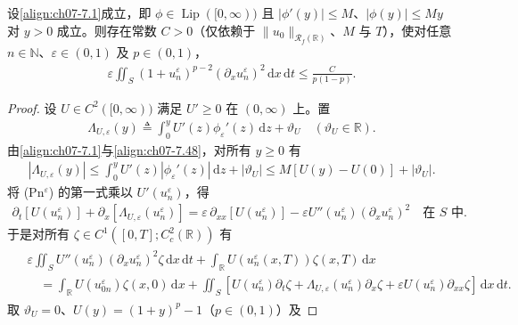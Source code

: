 ﻿\documentclass[../../main.tex]{subfiles}%
\begin{document}
\begin{lemma}\label{lemma:ch07-7.4.2}
设\eqref{align:ch07-7.1}成立，即 $\phi\in\operatorname{Lip}([0,\infty))$ 且 $|\phi'(y)|\leqslant M$、$|\phi(y)|\leqslant My$ 对 $y>0$ 成立。则存在常数 $C>0$（仅依赖于 $\|u_0\|_{\mathscr{R}_f(\mathbb{R})}$、$M$ 与 $T$），使对任意 $n\in\mathbb{N}$、$\varepsilon\in(0,1)$ 及 $p\in(0,1)$，
\begin{align}
\varepsilon\iint_S(1+u_n^\varepsilon)^{p-2}(\partial_xu_n^\varepsilon)^2\,\mathrm{d}x\,\mathrm{d}t
\leqslant\frac{C}{p(1-p)}. \label{align:ch07-7.53}
\end{align}
\end{lemma}

\begin{proof}
设 $U\in C^2([0,\infty))$ 满足 $U'\geqslant0$ 在 $(0,\infty)$ 上。置
\begin{align}
\Lambda_{U,\varepsilon}(y)\triangleq\int_0^yU'(z)\phi_\varepsilon'(z)\,\mathrm{d}z+\vartheta_U\quad(\vartheta_U\in\mathbb{R}). \label{align:ch07-7.54}
\end{align}
由\eqref{align:ch07-7.1}与\eqref{align:ch07-7.48}，对所有 $y\geqslant0$ 有
\begin{align}
|\Lambda_{U,\varepsilon}(y)|\leqslant\int_0^yU'(z)|\phi_\varepsilon'(z)|\,\mathrm{d}z+|\vartheta_U|
\leqslant M[U(y)-U(0)]+|\vartheta_U|. \label{align:ch07-7.55}
\end{align}
将 (Pn$^\varepsilon$) 的第一式乘以 $U'(u_n^\varepsilon)$，得
\begin{align}
\partial_t[U(u_n^\varepsilon)]+\partial_x[\Lambda_{U,\varepsilon}(u_n^\varepsilon)]
=\varepsilon\,\partial_{xx}[U(u_n^\varepsilon)]-\varepsilon U''(u_n^\varepsilon)(\partial_xu_n^\varepsilon)^2
\quad\text{在 }S\text{ 中}. \label{align:ch07-7.56}
\end{align}
于是对所有 $\zeta\in C^1([0,T];C^2_c(\mathbb{R}))$ 有
\begin{align}
\begin{aligned}
&\varepsilon\iint_SU''(u_n^\varepsilon)(\partial_xu_n^\varepsilon)^2\zeta\,\mathrm{d}x\,\mathrm{d}t
+\int_{\mathbb{R}}U(u_n^\varepsilon(x,T))\zeta(x,T)\,\mathrm{d}x\\
&\quad=\int_{\mathbb{R}}U(u_{0n}^\varepsilon)\zeta(x,0)\,\mathrm{d}x
+\iint_S[U(u_n^\varepsilon)\partial_t\zeta+\Lambda_{U,\varepsilon}(u_n^\varepsilon)\partial_x\zeta
+\varepsilon U(u_n^\varepsilon)\partial_{xx}\zeta]\,\mathrm{d}x\,\mathrm{d}t.
\end{aligned} 
\label{align:ch07-7.57}
\end{align}
取 $\vartheta_U=0$、$U(y)=(1+y)^p-1$（$p\in(0,1)$）及

\end{proof}
\end{document}
